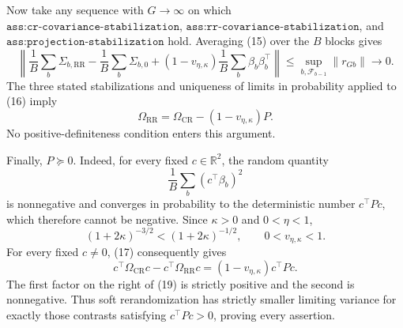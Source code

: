 Now take any sequence with \(G\to\infty\) on which \(\texttt{ass:cr-covariance-stabilization}\), \(\texttt{ass:rr-covariance-stabilization}\), and \(\texttt{ass:projection-stabilization}\) hold.  Averaging (15) over the \(B\) blocks gives
\[
\left\|
\frac1B\sum_b\Sigma_{b,\mathrm{RR}}
-\frac1B\sum_b\Sigma_{b,0}
+(1-v_{\eta,\kappa})\frac1B\sum_b\beta_b\beta_b^\top
\right\|
\le\sup_{b,\mathcal F_{b-1}}\|r_{Gb}\|\longrightarrow0.
\tag{16}
\]
The three stated stabilizations and uniqueness of limits in probability applied to (16) imply
\[
\Omega_{\mathrm{RR}}=\Omega_{\mathrm{CR}}-(1-v_{\eta,\kappa})P.
\tag{17}
\]
No positive-definiteness condition enters this argument.

Finally, \(P\succeq0\).  Indeed, for every fixed \(c\in\mathbb R^2\), the random quantity
\[
\frac1B\sum_b(c^\top\beta_b)^2
\]
is nonnegative and converges in probability to the deterministic number \(c^\top Pc\), which therefore cannot be negative.  Since \(\kappa>0\) and \(0<\eta<1\),
\[
(1+2\kappa)^{-3/2}<(1+2\kappa)^{-1/2},
\qquad
0<v_{\eta,\kappa}<1.
\tag{18}
\]
For every fixed \(c\ne0\), (17) consequently gives
\[
c^\top\Omega_{\mathrm{CR}}c-c^\top\Omega_{\mathrm{RR}}c
=(1-v_{\eta,\kappa})c^\top Pc.
\tag{19}
\]
The first factor on the right of (19) is strictly positive and the second is nonnegative.  Thus soft rerandomization has strictly smaller limiting variance for exactly those contrasts satisfying \(c^\top Pc>0\), proving every assertion.